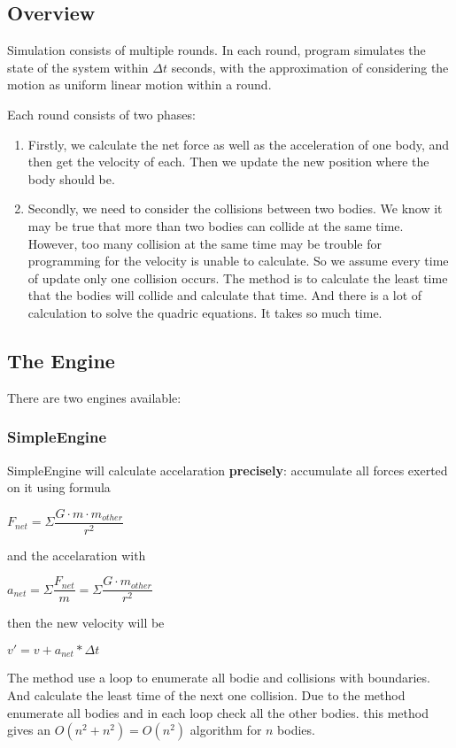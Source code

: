 \documentclass{article}
\newcommand{\centerize}[1]{\begin{center} #1 \end{center}}
\begin{document}
	\subsection{Overview}
		Simulation consists of multiple rounds. In each round, program
		simulates the state of the system within $\Delta t$ seconds, with the
		approximation of considering the motion as uniform linear motion within
		a round.

		Each round consists of two phases:
		\begin{enumerate}
			\item
				Firstly, we calculate the net force as well as the acceleration
				of one body, and then get the velocity of each. Then we update
				the new position where the body should be.
			\item
				Secondly, we need to consider the collisions between two bodies.
				We know it may be true that more than two bodies can collide
				at the same time. However, too many collision at the same time
				may be trouble for programming for the velocity is unable to
				calculate. So we assume every time of update only one collision
				occurs. The method is to calculate the least time that the bodies
				will collide and calculate that time. And there is a lot of
				calculation to solve the quadric equations. It takes so much
				time.

		\end{enumerate}

	\subsection{The Engine}
		There are two engines available:
			\subsubsection{SimpleEngine}

				SimpleEngine will calculate accelaration {\bf precisely}:
				accumulate all forces exerted on it using formula
				\centerize{$F_{net} = \Sigma \dfrac{G \cdot m \cdot m_{other}}{r^2}$}
				and the accelaration with
				\centerize{$a_{net} = \Sigma \dfrac{F_{net}}{m} = \Sigma \dfrac{G \cdot m_{other}}{r^2} $}
				then the new velocity will be
				\centerize{$v\prime = v + a_{net} * \Delta t$}

				The method use a loop to enumerate all bodie and collisions
				with boundaries. And calculate the least time of the next one
				collision.
				Due to the method enumerate all bodies and in each loop check
				all the other bodies. this method gives an $O(n^2 + n^2) = O(n^2)$
				algorithm for $n$ bodies.
\end{document}
